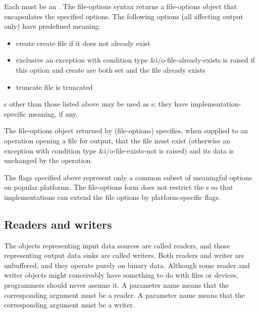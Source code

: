 \begin{entry}{%
}

Each  must be an .
The {\cf file-options} syntax returns a file-options object that 
encapsulates the
specified options. The following options (all affecting output
only) have predefined meaning:

\begin{itemize}   
\item {\cf create} create file if it does not already exist
\item {\cf exclusive} an exception with condition type
  {\cf\&i/o-file-already-exists} is raised if this
  option and {\cf create} are both set and the file already exists
\item {\cf truncate}
  file is truncated
\end{itemize}

s other than those listed above may be used as s;
they have implementation-specific meaning, if any.

The file-options object returned by {\cf (file-options)} specifies,
when supplied to an operation opening a file for output, that the file
must exist (otherwise an exception with condition type
{\cf\&i/o-file-exists-not} is raised) and its data is unchanged by the
operation.

\begin{rationale}
  The flags specified above represent only a common subset of
  meaningful options on popular platforms.  The {\cf file-options}
  form does not restrict the s so that
  implementations can extend the file options by platform-specific
  flags.
\end{rationale}
\end{entry}   

\subsection{Readers and writers}

The objects representing input data sources are called readers, and
those representing output data sinks are called writers.
Both readers and writer are unbuffered, and they operate purely on binary data.  
Although some
reader and writer objects might conceivably have something to do with
files or devices, programmers should never assume it.
A  parameter name means that the
corresponding argument must be a reader.
A  parameter name means that the
corresponding argument must be a writer.

